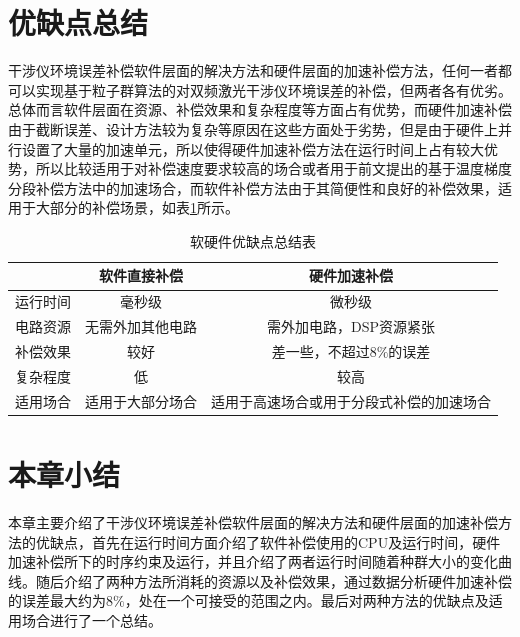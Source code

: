 \section{优缺点总结}
干涉仪环境误差补偿软件层面的解决方法和硬件层面的加速补偿方法，任何一者都可以实现基于粒子群算法的对双频激光干涉仪环境误差的补偿，但两者各有优劣。总体而言软件层面在资源、补偿效果和复杂程度等方面占有优势，而硬件加速补偿由于截断误差、设计方法较为复杂等原因在这些方面处于劣势，但是由于硬件上并行设置了大量的加速单元，所以使得硬件加速补偿方法在运行时间上占有较大优势，所以比较适用于对补偿速度要求较高的场合或者用于前文提出的基于温度梯度分段补偿方法中的加速场合，而软件补偿方法由于其简便性和良好的补偿效果，适用于大部分的补偿场景，如表\ref{tab:软硬件优缺点总结表}所示。
\begin{table}[H]
  \centering
  \caption{软硬件优缺点总结表}
  \label{tab:软硬件优缺点总结表}
  \begin{tabular}{c|c|c}
      \hline
                                    & 软件直接补偿        & 硬件加速补偿                  \\ \hline
      运行时间                       & 毫秒级             & 微秒级                        \\ \hline
      电路资源                       & 无需外加其他电路    & 需外加电路，DSP资源紧张        \\ \hline
      补偿效果                       & 较好               & 差一些，不超过8$\%$的误差     \\ \hline
      复杂程度                       & 低                 & 较高                          \\ \hline
      适用场合                       & 适用于大部分场合    & 适用于高速场合或用于分段式补偿的加速场合 \\ \hline
  \end{tabular}
\end{table}

\section{本章小结}
本章主要介绍了干涉仪环境误差补偿软件层面的解决方法和硬件层面的加速补偿方法的优缺点，首先在运行时间方面介绍了软件补偿使用的CPU及运行时间，硬件加速补偿所下的时序约束及运行，并且介绍了两者运行时间随着种群大小的变化曲线。随后介绍了两种方法所消耗的资源以及补偿效果，通过数据分析硬件加速补偿的误差最大约为$8\%$，处在一个可接受的范围之内。最后对两种方法的优缺点及适用场合进行了一个总结。